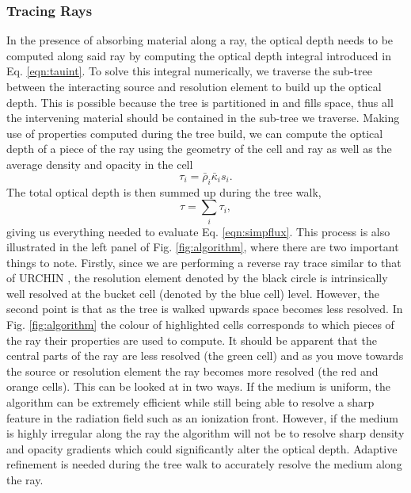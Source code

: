 \documentclass[fleq,usenatbib]{mnras}
\begin{document}
\subsubsection{Tracing Rays}
In the presence of absorbing material along a ray, the optical depth needs to 
be computed along said ray by computing the optical depth integral introduced 
in Eq. \ref{eqn:tauint}. To solve this integral numerically, we traverse the 
sub-tree between the interacting source and resolution element to build up the 
optical depth. This is possible because the tree is partitioned in and fills 
space, thus all the intervening material should be contained in the sub-tree 
we traverse. Making use of properties computed during the tree build, we can 
compute the optical depth of a piece of the ray using the geometry of the cell 
and ray as well as the average density and opacity in the cell
\begin{equation}
\label{eqn:taui}
\tau_i = \bar{\rho}_i \bar{\kappa}_i s_i.
\end{equation}
The total optical depth is then summed up during the tree walk,
\begin{equation}
\label{eqn:tausum}
\tau = \sum_i \tau_i,
\end{equation}
giving us everything needed to evaluate Eq. \ref{eqn:simpflux}. This process 
is also illustrated in the left panel of Fig. \ref{fig:algorithm}, where there 
are two important things to note. Firstly, since we are performing a reverse 
ray trace similar to that of URCHIN \citep{altayTheuns13}, the resolution 
element denoted by the black circle is intrinsically well resolved at the 
bucket cell (denoted by the blue cell) level. However, the second point is 
that as the tree is walked upwards space becomes less resolved. In Fig. 
\ref{fig:algorithm} the colour of highlighted cells corresponds to which 
pieces of the ray their properties are used to compute. It should be apparent 
that the central parts of the ray are less resolved (the green cell) and as 
you move towards the source or resolution element the ray becomes more 
resolved (the red and orange cells). This can be looked at in two ways. 
If the medium is uniform, the algorithm can be extremely efficient 
while still being able to resolve a sharp feature in the radiation field such 
as an ionization front. However, if the medium is highly irregular along the 
ray the algorithm will not be to resolve sharp density and opacity gradients 
which could significantly alter the optical depth. Adaptive refinement is 
needed during the tree walk to accurately resolve the medium along the ray.
\end{document}

